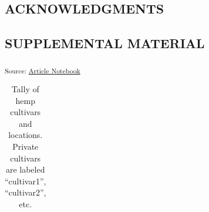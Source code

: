 \documentclass[
]{agujournal2019}
\begin{document}
\subsection{ACKNOWLEDGMENTS}\label{acknowledgments}

\subsection{SUPPLEMENTAL MATERIAL}\label{supplemental-material}

\textsubscript{Source:
\href{https://rvcrawford.github.io/glowing-system/index.qmd.html}{Article
Notebook}}

\begin{longtable}[]{@{}lrrrrrr@{}}

\caption{\label{tbl-hemp_provenance}Tally of hemp cultivars and
locations. Private cultivars are labeled ``cultivar1'', ``cultivar2'',
etc.}

\tabularnewline


\end{longtable}
\end{document}
